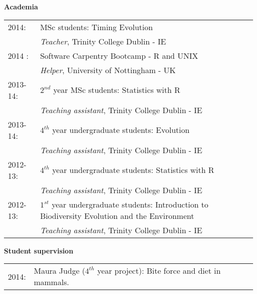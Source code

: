 \documentclass[10pt,a4paper]{article}
\begin{document}
{\raggedright\textbf{Academia}\\[1.5ex]
\begin{tabular}{ll}
2014: & MSc students: Timing Evolution \\
& \textit{Teacher}, Trinity College Dublin - IE \\
2014 : & Software Carpentry Bootcamp - R and UNIX \\
& \textit{Helper}, University of Nottingham - UK \\
2013-14: & $2^{nd}$ year MSc students: Statistics with R \\
& \textit{Teaching assistant}, Trinity College Dublin - IE \\
2013-14: & $4^{th}$ year undergraduate students: Evolution\\
& \textit{Teaching assistant}, Trinity College Dublin - IE\\
2012-13: & $4^{th}$ year undergraduate students: Statistics with R\\
& \textit{Teaching assistant}, Trinity College Dublin - IE\\
2012-13: & $1^{st}$ year undergraduate students: Introduction to Biodiversity Evolution and the Environment\\
& \textit{Teaching assistant}, Trinity College Dublin - IE\\
\end{tabular}
\raggedright\textbf{Student supervision}\\[1.5ex]
\begin{tabular}{ll}
2014: & Maura Judge ($4^{th}$ year project): Bite force and diet in mammals. \\
\end{tabular}
\bigskip

}
\end{document}
